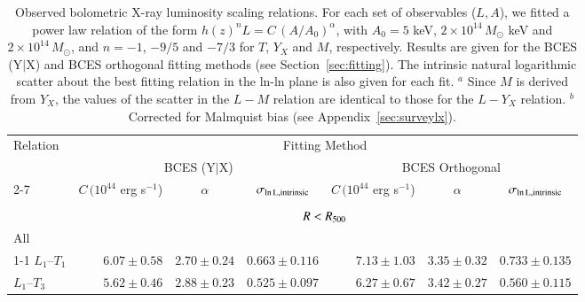 \documentclass[oldversion]{aa}
\begin{document}
{%

\begin{table}[]
\begin{center}
\caption{{\footnotesize Observed bolometric X-ray luminosity scaling relations. For each set of observables ($L,A$), we fitted a power law relation of the form 
$h(z)^n L = C\, (A/A_0)^{\alpha}$, with $A_0=5$ keV, $2\times10^{14}\,
M_{\odot}$ keV and $2\times10^{14}\,
M_{\odot}$, and $n= -1$, $-9/5$ and $-7/3$ for $T$, $Y_X$ and $M$, respectively. Results are given for the BCES (Y$|$X) and BCES orthogonal fitting methods (see Section~\ref{sec:fitting}). The intrinsic natural logarithmic scatter about
the best fitting relation in the ln-ln plane is also given for each fit. $^a$ Since $M$ is derived from $Y_X$, the values of the scatter in the $L-M$ relation are identical to those for the $L-Y_X$ relation. $^b$ Corrected for Malmquist bias (see Appendix~\ref{sec:surveylx}).
}}\label{tab:lxrel}
\begin{tabular}{l r l l | r l l }
\hline
\hline


\multicolumn{1}{l}{Relation } &
\multicolumn{6}{c}{Fitting Method} \\

\multicolumn{1}{c}{ } &
\multicolumn{3}{c|}{BCES (Y$|$X)} & \multicolumn{3}{c}{BCES Orthogonal} \\

\cline{2-7}

\multicolumn{1}{c }{ } & \multicolumn{1}{c}{$C\,(10^{44}$ erg s$^{-1}$)} & 
\multicolumn{1}{c}{$\alpha$} & \multicolumn{1}{c|}{$\sigma_{\rm ln\,L, intrinsic}$ } & \multicolumn{1}{c}{$C\,(10^{44}$ erg s$^{-1}$)} & 
\multicolumn{1}{c}{$\alpha$} & \multicolumn{1}{c}{$\sigma_{\rm ln\,L, intrinsic}$ } \\

\hline

\\
\multicolumn{1}{c}{} & \multicolumn{6}{c}{$R < R_{500}$} \\

All \\
\cline{1-1}
$L_1$--$T_1$ & $6.07\pm0.58$ & $2.70\pm0.24$ & $0.663\pm0.116$ & 
				$7.13\pm1.03$ & $3.35\pm0.32$ & $0.733\pm0.135$ \\ 

$L_1$--$T_3$ & $5.62\pm0.46$ & $2.88\pm0.23$ & $0.525\pm0.097$ & 
				$6.27\pm0.67$ & $3.42\pm0.27$ & $0.560\pm0.115$ \\ 


\end{tabular}
\end{center}
\end{table}}
\end{document}
